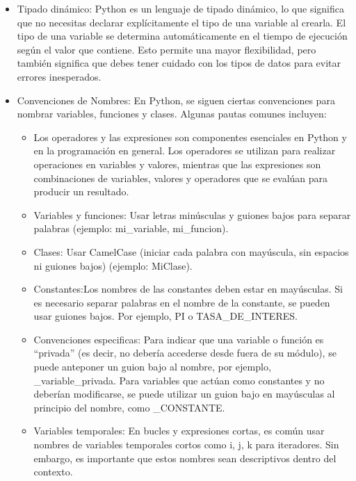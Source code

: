 \begin{itemize}
\begin{figure}[h]
{    }
    \end{figure}
    \item Tipado dinámico: Python es un lenguaje de tipado dinámico, lo que significa que no necesitas declarar explícitamente el tipo de una variable al crearla. El tipo de una variable se determina automáticamente en el tiempo de ejecución según el valor que contiene. Esto permite una mayor flexibilidad, pero también significa que debes tener cuidado con los tipos de datos para evitar errores inesperados. 
\begin{figure}[h]
    \centering
    \end{figure}
    \item Convenciones de Nombres: En Python, se siguen ciertas convenciones para nombrar variables, funciones y clases. Algunas pautas comunes incluyen:

\begin{itemize}
    \item Los operadores y las expresiones son componentes esenciales en Python y en la programación en general. Los operadores se utilizan para realizar operaciones en variables y valores, mientras que las expresiones son combinaciones de variables, valores y operadores que se evalúan para producir un resultado. 
    \item Variables y funciones: Usar letras minúsculas y guiones bajos para separar palabras (ejemplo: mi\_variable, mi\_funcion).
    \item Clases: Usar CamelCase (iniciar cada palabra con mayúscula, sin espacios ni guiones bajos) (ejemplo: MiClase).
    \item Constantes:Los nombres de las constantes deben estar en mayúsculas. Si es necesario separar palabras en el nombre de la constante, se pueden usar guiones bajos. Por ejemplo, PI o TASA\_DE\_INTERES.
    \item Convenciones especificas: Para indicar que una variable o función es ``privada'' (es decir, no debería accederse desde fuera de su módulo), se puede anteponer un guion bajo al nombre, por ejemplo, \_variable\_privada. Para variables que actúan como constantes y no deberían modificarse, se puede utilizar un guion bajo en mayúsculas al principio del nombre, como \_CONSTANTE.
    \item Variables temporales: En bucles y expresiones cortas, es común usar nombres de variables temporales cortos como i, j, k para iteradores. Sin embargo, es importante que estos nombres sean descriptivos dentro del contexto.
\end{itemize}


\end{itemize}

